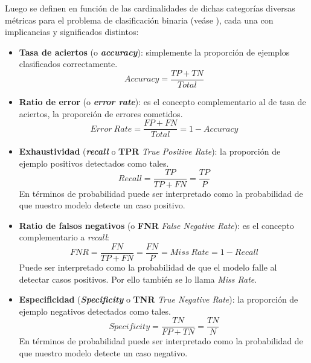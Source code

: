 Luego se definen en función de las cardinalidades de dichas categorías diversas métricas para el problema de clasificación binaria (veáse \cite{metricas-binarias}), cada una con implicancias y significados distintos:
\begin{itemize}
    \item \textbf{Tasa de aciertos} (o \textit{\textbf{accuracy}}): simplemente la proporción de ejemplos clasificados correctamente.
    \begin{equation*}
        Accuracy = \frac{TP+TN}{Total}
    \end{equation*}
    
    \item \textbf{Ratio de error} (o \textit{\textbf{error rate}}): es el concepto complementario al de tasa de aciertos, la proporción de errores cometidos.
    \begin{equation*}
        Error~Rate = \frac{FP+FN}{Total} = 1 - Accuracy
    \end{equation*}
    
    
    \item \textbf{Exhaustividad} (\textit{\textbf{recall}} o \textbf{TPR} \textit{True Positive Rate}): la proporción de ejemplo positivos detectados como tales.
    \begin{equation*}
    Recall = \frac{TP}{TP+FN} = \frac{TP}{P}
    \end{equation*}
    En términos de probabilidad puede ser interpretado como la probabilidad de que nuestro modelo detecte un caso positivo.
    
    \item \textbf{Ratio de falsos negativos} (o \textbf{FNR} \textit{False Negative Rate}): es el concepto complementario a \textit{recall}:
    \begin{equation*}
    FNR = \frac{FN}{TP+FN} = \frac{FN}{P} = Miss~Rate = 1 - Recall
    \end{equation*}
    Puede ser interpretado como la probabilidad de que el modelo falle al detectar casos positivos. Por ello también se lo llama \textit{Miss Rate}.
    
    
    \item \textbf{Especificidad} (\textbf{\textit{Specificity}} o \textbf{TNR} \textit{True Negative Rate}): la proporción de ejemplo negativos detectados como tales.
    \begin{equation*}
    Specificity = \frac{TN}{FP+TN} = \frac{TN}{N}
    \end{equation*}
    En términos de probabilidad puede ser interpretado como la probabilidad de que nuestro modelo detecte un caso negativo.
    

\end{itemize}
